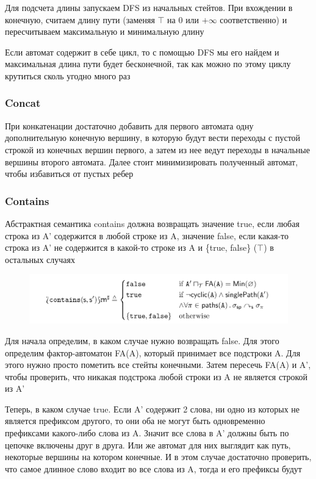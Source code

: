 Для подсчета длины запускаем DFS из начальных стейтов. При вхождении в конечную, считаем длину пути (заменяя $\top$ на $0$ или $+\infty$ соответственно) и пересчитываем максимальную и минимальную длину

Если автомат содержит в себе цикл, то с помощью DFS мы его найдем и максимальная длина пути будет бесконечной, так как можно по этому циклу крутиться сколь угодно много раз

\subsubsection*{Concat}
При конкатенации достаточно добавить для первого автомата одну дополнительную конечную вершину, в которую будут вести переходы с пустой строкой из конечных вершин первого, а затем из нее ведут переходы в начальные вершины второго автомата. Далее стоит минимизировать полученный автомат, чтобы избавиться от пустых ребер

\newpage
\subsubsection*{Contains}
Абстрактная семантика contains должна возвращать значение true, если любая строка из A' содержится в любой строке из A, значение false, если какая-то строка из A' не содержится в какой-то строке из A и \{true, false\} ($\top$) в остальных случаях
\begin{figure}[H]
\includegraphics[width=\textwidth]{images/tarsis-contains.png}\hfill
\end{figure}
Для начала определим, в каком случае нужно возвращать false. Для этого определим фактор-автоматон FA(A), который принимает все подстроки A. Для этого нужно просто пометить все стейты конечными. Затем пересечь FA(A) и A', чтобы проверить, что никакая подстрока любой строки из A не является строкой из A'

Теперь, в каком случае true. Если A' содержит 2 слова, ни одно из которых не является префиксом другого, то они оба не могут быть одновременно префиксами какого-либо слова из A. Значит все слова в A' должны быть по цепочке включены друг в друга. Или же автомат для них выглядит как путь, некоторые вершины на котором конечные. И в этом случае достаточно проверить, что самое длинное слово входит во все слова из A, тогда и его префиксы будут

